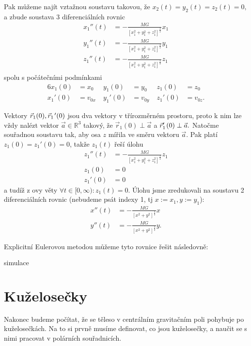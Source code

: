 Pak můžeme najít vztažnou soustavu takovou, že $x_2(t)=y_2(t)=z_2(t)=0,$ a zbude soustava 3 diferenciálních rovnic
\begin{align*}
		x_1''(t) &= -\frac{MG}{[x_1^2+y_1^2+z_1^2]^{\frac{3}{2}}}x_1 \\
		y_1''(t) &= -\frac{MG}{[x_1^2+y_1^2+z_1^2]^{\frac{3}{2}}}y_1 \\
		z_1''(t) &= -\frac{MG}{[x_1^2+y_1^2+z_1^2]^{\frac{3}{2}}}z_1 \\
\end{align*}
spolu s počátečními podmínkami
\begin{alignat*}{6}
	x_1(0) &= x_0 & y_1(0)&=y_0 & z_1(0)&=z_0 \\
	x_1'(0) &= v_{0x}\; & y_1'(0)&=v_{0y}\; & z_1'(0)&=v_{0z}.
\end{alignat*}

Vektory $\vec{r}_1(0), \vec{r}_1\hspace{.1em}'(0)$ jsou dva vektory v třírozměrném prostoru, proto k nim lze vždy nalézt vektor $\vec{a}\in \mathbb{R}^3$ takový, že $\vec{r}_1(0)\perp \vec{a}$ a $\vec{r}_1'\hspace{.1em}(0)\perp \vec{a}.$ Natočme souřadnou soustavu tak, aby osa $z$ mířila ve směru vektoru $\vec{a}$. Pak platí $z_1(0)=z_1'(0)=0$, takže $z_1(t)$ řeší úlohu
\begin{align*} 
		z_1''(t) &= -\frac{MG}{[x_1^2+y_1^2+z_1^2]^{\frac{3}{2}}}z_1 \\
		z_1(0) &= 0 \\
		z_1'(0) &= 0
\end{align*}
a tudíž z \PL ovy věty $\forall t\in [0,\infty)\colon z_1(t)=0.$ Úlohu jsme zredukovali na soustavu 2 diferenciálních rovnic (nebudeme psát indexy 1, tj $x:=x_1, y:=y_1$):
\begin{align*}
		x''(t) &= -\frac{MG}{[x^2+y^2]^{\frac{3}{2}}}x \\
		y''(t) &= -\frac{MG}{[x^2+y^2]^{\frac{3}{2}}}y.
\end{align*}

Explicitní Eulerovou metodou můžeme tyto rovnice řešit následovně:
\begin{Todo}
  simulace
\end{Todo}


\section{Kuželosečky}
Nakonec budeme počítat, že se těleso v centrálním gravitačním poli pohybuje po kuželosečkách. Na to si prvně musíme definovat, co jsou kuželosečky, a naučit se s nimi pracovat v polárních souřadnicích.

